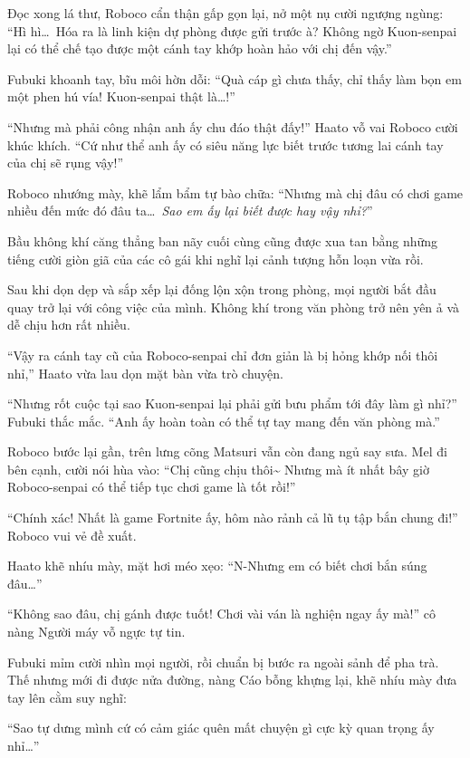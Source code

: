 \documentclass[../main.tex]{subfiles}
\begin{document}
Đọc xong lá thư, Roboco cẩn thận gấp gọn lại, nở một nụ cười ngượng ngùng: ``Hì hì\dots\ Hóa ra là linh kiện dự phòng được gửi trước à? Không ngờ Kuon-senpai lại có thể chế tạo được một cánh tay khớp hoàn hảo với chị đến vậy.''

Fubuki khoanh tay, bĩu môi hờn dỗi: ``Quà cáp gì chưa thấy, chỉ thấy làm bọn em một phen hú vía! Kuon-senpai thật là\dots!''

``Nhưng mà phải công nhận anh ấy chu đáo thật đấy!'' Haato vỗ vai Roboco cười khúc khích. ``Cứ như thể anh ấy có siêu năng lực biết trước tương lai cánh tay của chị sẽ rụng vậy!''

Roboco nhướng mày, khẽ lẩm bẩm tự bào chữa: ``Nhưng mà chị đâu có chơi game nhiều đến mức đó đâu ta\dots\ \textit{Sao em ấy lại biết được hay vậy nhỉ?}''

Bầu không khí căng thẳng ban nãy cuối cùng cũng được xua tan bằng những tiếng cười giòn giã của các cô gái khi nghĩ lại cảnh tượng hỗn loạn vừa rồi.

\ct

Sau khi dọn dẹp và sắp xếp lại đống lộn xộn trong phòng, mọi người bắt đầu quay trở lại với công việc của mình. Không khí trong văn phòng trở nên yên ả và dễ chịu hơn rất nhiều.

``Vậy ra cánh tay cũ của Roboco-senpai chỉ đơn giản là bị hỏng khớp nối thôi nhỉ,'' Haato vừa lau dọn mặt bàn vừa trò chuyện.

``Nhưng rốt cuộc tại sao Kuon-senpai lại phải gửi bưu phẩm tới đây làm gì nhỉ?'' Fubuki thắc mắc. ``Anh ấy hoàn toàn có thể tự tay mang đến văn phòng mà.''

Roboco bước lại gần, trên lưng cõng Matsuri vẫn còn đang ngủ say sưa. Mel đi bên cạnh, cười nói hùa vào: ``Chị cũng chịu thôi\~{} Nhưng mà ít nhất bây giờ Roboco-senpai có thể tiếp tục chơi game là tốt rồi!''

``Chính xác! Nhất là game Fortnite ấy, hôm nào rảnh cả lũ tụ tập bắn chung đi!'' Roboco vui vẻ đề xuất.

Haato khẽ nhíu mày, mặt hơi méo xẹo: ``N-Nhưng em có biết chơi bắn súng đâu\dots''

``Không sao đâu, chị gánh được tuốt! Chơi vài ván là nghiện ngay ấy mà!'' cô nàng Người máy vỗ ngực tự tin.

Fubuki mỉm cười nhìn mọi người, rồi chuẩn bị bước ra ngoài sảnh để pha trà. Thế nhưng mới đi được nửa đường, nàng Cáo bỗng khựng lại, khẽ nhíu mày đưa tay lên cằm suy nghĩ:

``Sao tự dưng mình cứ có cảm giác quên mất chuyện gì cực kỳ quan trọng ấy nhỉ\dots''
\omk
\end{document}
